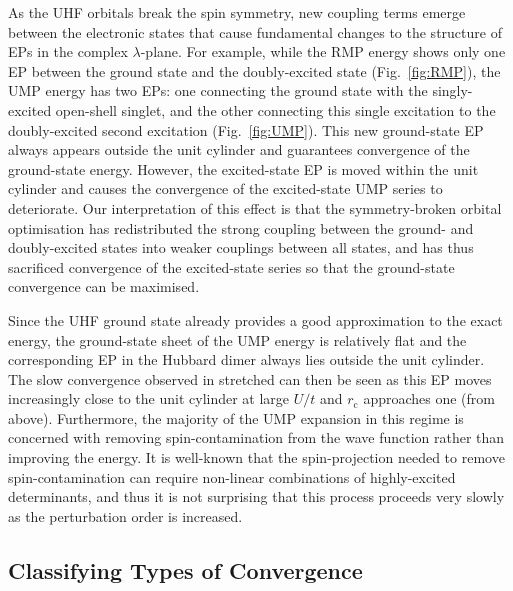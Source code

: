 \documentclass[aps,prb,reprint,noshowkeys,superscriptaddress]{revtex4-1}
\newcommand{\rc}{r_{\text{c}}}
\begin{document}
As the UHF orbitals break the spin symmetry, new coupling terms emerge between the electronic states that
cause fundamental changes to the structure of EPs in the complex $\lambda$-plane.
For example, while the RMP energy shows only one EP between the ground state and 
the doubly-excited state (Fig.~\ref{fig:RMP}), the UMP energy has two EPs: one connecting the ground state with the
singly-excited open-shell singlet, and the other connecting this single excitation to the 
doubly-excited second excitation (Fig.~\ref{fig:UMP}).
This new ground-state EP always appears outside the unit cylinder and guarantees convergence of the ground-state energy.
However, the excited-state EP is moved within the unit cylinder and causes the 
convergence of the excited-state UMP series to deteriorate.
Our interpretation of this effect is that the symmetry-broken orbital optimisation has redistributed the strong 
coupling between the ground- and doubly-excited states into weaker couplings between all states, and has thus
sacrificed convergence of the excited-state series so that the ground-state convergence can be maximised.

Since the UHF ground state already provides a good approximation to the exact energy, the ground-state sheet of
the UMP energy is relatively flat and the corresponding EP in the Hubbard dimer always lies outside the unit cylinder.
The slow convergence observed in stretched \cite{Gill_1988} can then be seen as this EP 
moves increasingly close to the unit cylinder at large $U/t$ and $\rc$ approaches one (from above).
Furthermore, the majority of the UMP expansion in this regime is concerned with removing spin-contamination from the wave 
function rather than improving the energy.
It is well-known that the spin-projection needed to remove spin-contamination can require non-linear combinations
of highly-excited determinants,\cite{Lowdin_1955c} and thus it is not surprising that this process proceeds 
very slowly as the perturbation order is increased.

\subsection{Classifying Types of Convergence} %
\end{document}
